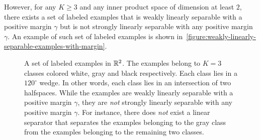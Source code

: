 However, for any $K \ge 3$ and any inner product space of dimension at least
$2$, there exists a set of labeled examples that is weakly linearly separable
with a positive margin $\gamma$ but is not strongly linearly separable with
any positive margin $\gamma$. An example of such set of labeled examples is
shown in~\autoref{figure:weakly-linearly-separable-examples-with-margin}.

\begin{figure}
\begin{center}

\end{center}
\caption[]{A set of labeled examples in $\mathbb{R}^2$. The examples belong to
$K=3$ classes colored white, gray and black respectively. Each class lies in a
$120^\circ$ wedge. In other words, each class lies in an intersection of two
halfspaces. While the examples are weakly linearly separable with a positive margin
$\gamma$, they are \emph{not} strongly linearly separable with any positive
margin $\gamma$. For instance, there does \emph{not} exist a linear separator
that separates the examples belonging to the gray class from the examples
belonging to the remaining two classes.
}
\label{figure:weakly-linearly-separable-examples-with-margin}
\end{figure}
